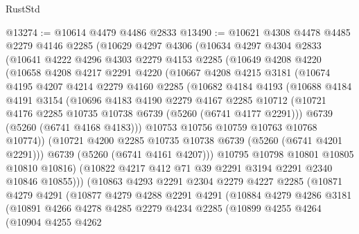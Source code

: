\begin{lexlean}{RustStd}
\begin{coremodule}
@13274 := @10614 @4479 @4486 @2833
@13490 := @10621
    @4308
    @4478
    @4485
    @2279
    @4146
    @2285
    (@10629
      @4297
      @4306
      (@10634
        @4297
        @4304
        @2833
        (@10641
          @4222
          @4296
          @4303
          @2279
          @4153
          @2285
          (@10649
            @4208
            @4220
            (@10658
              @4208
              @4217
              @2291
              @4220
              (@10667
                @4208
                @4215
                @3181
                (@10674
                  @4195
                  @4207
                  @4214
                  @2279
                  @4160
                  @2285
                  (@10682
                    @4184
                    @4193
                    (@10688
                      @4184
                      @4191
                      @3154
                      (@10696
                        @4183
                        @4190
                        @2279
                        @4167
                        @2285
                        @10712
                        (@10721 @4176 @2285 @10735 @10738 @6739 (@5260 (@6741 @4177 @2291)))
                        @6739
                        (@5260 (@6741 @4168 @4183)))
                      @10753
                      @10756
                      @10759
                      @10763
                      @10768
                      @10774))
                  (@10721 @4200 @2285 @10735 @10738 @6739 (@5260 (@6741 @4201 @2291)))
                  @6739
                  (@5260 (@6741 @4161 @4207)))
                @10795
                @10798
                @10801
                @10805
                @10810
                @10816)
              (@10822 @4217 @412 @71 @39 @2291 @3194 @2291 @2340 @10846 @10855)))
          (@10863
            @4293
            @2291
            @2304
            @2279
            @4227
            @2285
            (@10871
              @4279
              @4291
              (@10877
                @4279
                @4288
                @2291
                @4291
                (@10884
                  @4279
                  @4286
                  @3181
                  (@10891
                    @4266
                    @4278
                    @4285
                    @2279
                    @4234
                    @2285
                    (@10899
                      @4255
                      @4264
                      (@10904
                        @4255
                        @4262

\end{coremodule}
\end{lexlean}

